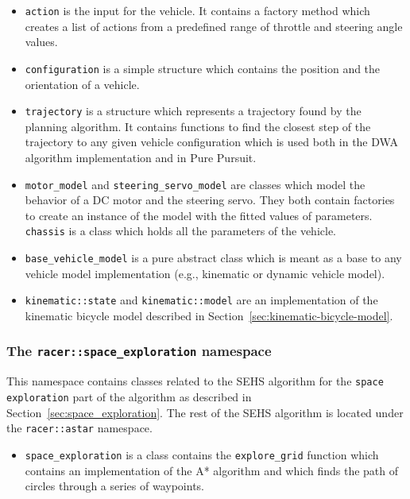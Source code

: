 \begin{itemize}
	\item \texttt{action} is the input for the vehicle. It contains a factory method which creates a list of actions from a predefined range of throttle and steering angle values.
	
	\item \texttt{configuration} is a simple structure which contains the position and the orientation of a vehicle.
	
	\item \texttt{trajectory} is a structure which represents a trajectory found by the planning algorithm. It contains functions to find the closest step of the trajectory to any given vehicle configuration which is used both in the DWA algorithm implementation and in Pure Pursuit.
	
	\item \texttt{motor\_model} and \texttt{steering\_servo\_model} are classes which model the behavior of a DC motor and the steering servo. They both contain factories to create an instance of the model with the fitted values of parameters. \texttt{chassis} is a class which holds all the parameters of the vehicle.
	
	\item \texttt{base\_vehicle\_model} is a pure abstract class which is meant as a base to any vehicle model implementation (e.g., kinematic or dynamic vehicle model).
	
	\item \texttt{kinematic::state} and \texttt{kinematic::model} are an implementation of the kinematic bicycle model described in Section~\ref{sec:kinematic-bicycle-model}.
\end{itemize}

\subsubsection{The \texttt{racer::space\_exploration} namespace}

This namespace contains classes related to the \gls{SEHS} algorithm for the \texttt{space exploration} part of the algorithm as described in Section~\ref{sec:space_exploration}. The rest of the SEHS algorithm is located under the \texttt{racer::astar} namespace.

\begin{itemize}
	\item \texttt{space\_exploration} is a class contains the \texttt{explore\_grid} function which contains an implementation of the A* algorithm and which finds the path of circles through a series of waypoints.
\end{itemize}

